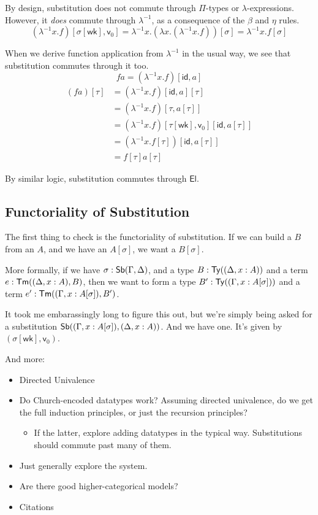 \documentclass{article}
\begin{document}
By design, substitution does not commute through \(\Pi\)-types or \(\lambda\)-expressions.
However, it \emph{does} commute through \(\lambda^{-1}\), as a consequence of the \(\beta\) and \(\eta\) rules.
\[(\lambda^{-1} x. f)[\sigma[\mathsf{wk}],\mathsf{v}_0]
= \lambda^{-1} x. (\lambda x. (\lambda^{-1} x. f))[\sigma]
= \lambda^{-1} x. f[\sigma]
\]

When we derive function application from \(\lambda^{-1}\) in the usual way, we see that substitution commutes through it too.
\[f a = (\lambda^{-1} x. f)[\mathsf{id},a]\]
\begin{align*}
    (f a)[\tau] &= (\lambda^{-1} x. f)[\mathsf{id},a][\tau]
    \\ &= (\lambda^{-1} x. f)[\tau,a[\tau]]
    \\ &= (\lambda^{-1} x. f)[\tau[\mathsf{wk}],\mathsf{v}_0][\mathsf{id},a[\tau]]
    \\ &= (\lambda^{-1} x. f[\tau])[\mathsf{id},a[\tau]]
    \\ &= f[\tau] a[\tau]
\end{align*}

By similar logic, substitution commutes through \(\mathsf{El}\).

\subsection{Functoriality of Substitution}

The first thing to check is the functoriality of substitution.
If we can build a \(B\) from an \(A\), and we have an \(A[\sigma]\), we want a \(B[\sigma]\).

More formally, if we have \(\sigma : \mathsf{Sb}(\Gamma,\Delta)\),
and a type \(B : \mathsf{Ty}((\Delta, x : A))\) and a term \(e : \mathsf{Tm}((\Delta, x : A), B)\),
then we want to form a type \(B' : \mathsf{Ty}((\Gamma, x : A[\sigma]))\)
and a term \(e' : \mathsf{Tm}((\Gamma, x : A[\sigma]), B')\).

It took me embarassingly long to figure this out, but we're simply being asked for a substitution
\(\mathsf{Sb}((\Gamma, x : A[\sigma]), (\Delta, x : A))\).
And we have one. It's given by \((\sigma[\mathsf{wk}],\mathsf{v}_0)\).

\pagebreak

\listoftodos

\noindent And more:

\begin{itemize}
    \item Directed Univalence
    \item Do Church-encoded datatypes work? Assuming directed univalence, do we get the full induction principles, or just the recursion principles?
    \begin{itemize}
        \item If the latter, explore adding datatypes in the typical way. Substitutions should commute past many of them.
    \end{itemize}
    \item Just generally explore the system.
    \item Are there good higher-categorical models?
    \item Citations
\end{itemize}

\printbibliography
\end{document}
